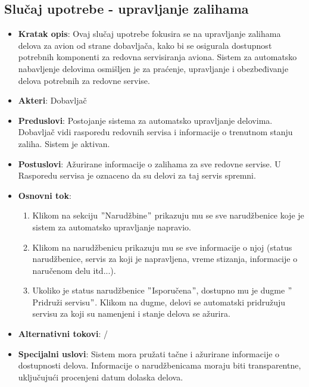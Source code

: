 \documentclass[a4paper]{article}
\begin{document}
\subsection{Slučaj upotrebe - upravljanje zalihama}
\label{subsec:redovan_servis}
\begin{itemize}
    \item \textbf{Kratak opis}: Ovaj slučaj upotrebe fokusira se na upravljanje zalihama delova za avion od strane dobavljača, kako bi se osigurala dostupnost potrebnih komponenti za redovna servisiranja aviona. Sistem za automatsko nabavljenje delovima osmišljen je za praćenje, upravljanje i obezbeđivanje delova potrebnih za redovne servise.
    \item \textbf{Akteri}: Dobavljač
    \item \textbf{Preduslovi}: Postojanje sistema za automatsko upravljanje delovima. Dobavljač vidi rasporedu redovnih servisa i informacije o trenutnom stanju zaliha. Sistem je aktivan.
    \item \textbf{Postuslovi}: Ažurirane informacije o zalihama za sve redovne servise. U Rasporedu servisa je oznaceno da su delovi za taj servis spremni.
    \item \textbf{Osnovni tok}:
        \begin{enumerate}
            \item Klikom na sekciju $"$Narudžbine$"$ prikazuju mu se sve narudžbenice koje je sistem za automatsko upravljanje napravio.
            \item Klikom na narudžbenicu prikazuju mu se sve informacije o njoj (status narudžbenice, servis za koji je napravljena, vreme stizanja, informacije o naručenom delu itd...).
            \item Ukoliko je status narudžbenice $"$Isporučena$"$, dostupno mu je dugme $"$Pridruži servisu$"$. Klikom na dugme, delovi se automatski pridružuju servisu za koji su namenjeni i stanje delova se ažurira.
        \end{enumerate}
    \item \textbf{Alternativni tokovi}: /
    \item \textbf{Specijalni uslovi}: Sistem mora pružati tačne i ažurirane informacije o dostupnosti delova. Informacije o narudžbenicama moraju biti transparentne, uključujući procenjeni datum dolaska delova.
\end{itemize}
\end{document}
